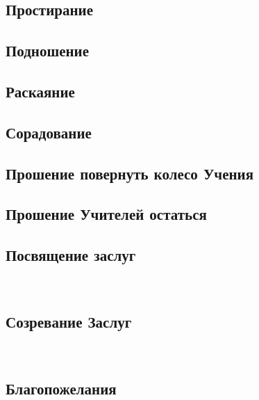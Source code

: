 \subsection*{Простирание}
\subsection*{Подношение}
\subsection*{Раскаяние}
\subsection*{Сорадование}
\subsection*{Прошение повернуть колесо Учения}
\subsection*{Прошение Учителей остаться}
\subsection*{Посвящение заслуг}
\\
\subsection{Созревание Заслуг}
\\
\subsection{Благопожелания}



